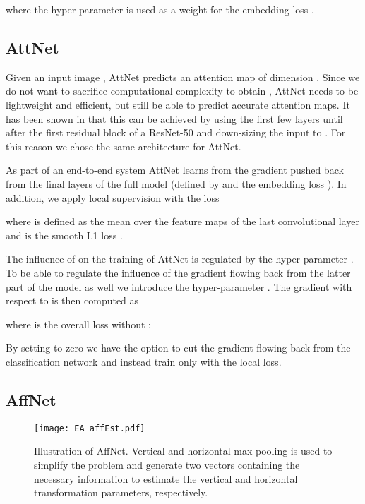 \documentclass{bmvc2k}
\begin{document}
where the hyper-parameter  is used as a weight for the embedding loss .

\subsection{AttNet}
\label{section:AttNet}
Given an input image , AttNet predicts an attention map  of dimension . Since we do not want to sacrifice computational complexity to obtain , AttNet needs to be lightweight and efficient, but still be able to predict accurate attention maps. It has been shown in \cite{Hanselmann_2020_WACV} that this can be achieved by using the first few layers until after the first residual block of a ResNet-50 \cite{he2016deep} and down-sizing the input to . For this reason we chose the same architecture for AttNet.

As part of an end-to-end system AttNet learns from the gradient pushed back from the final layers of the full model (defined by  and the embedding loss ). In addition, we apply local supervision with the loss

where  is defined as the mean over the feature maps of the last convolutional layer and  is the smooth L1 loss \cite{girshick2015fast}.

The influence of  on the training of AttNet is regulated by the hyper-parameter . To be able to regulate the influence of the gradient flowing back from the latter part of the model as well we introduce the hyper-parameter . The gradient with respect to  is then computed as



where  is the overall loss without :


By setting  to zero we have the option to cut the gradient flowing back from the classification network and instead train only with the local loss.

\subsection{AffNet}
\label{section:AffNet}
\begin{figure}[t]
\centerline{
\texttt{[image: EA\_affEst.pdf]}
}
\caption{Illustration of AffNet. Vertical and horizontal max pooling is used to simplify the problem and generate two vectors containing the necessary information to estimate  the vertical and horizontal transformation parameters, respectively.}
\label{fig:EA_affnet}
\end{figure}
\end{document}
